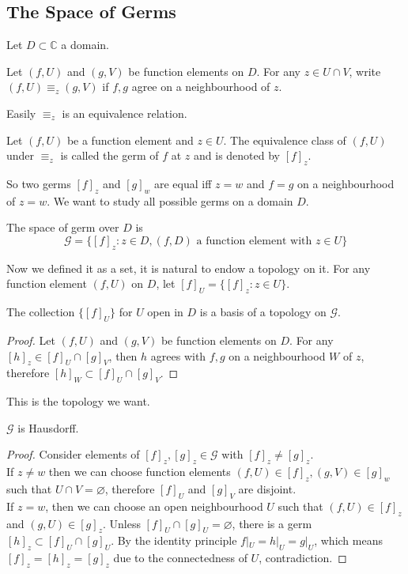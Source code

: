 \subsection{The Space of Germs}
Let $D\subset\mathbb C$ a domain.
\begin{definition}
    Let $(f,U)$ and $(g,V)$ be function elements on $D$.
    For any $z\in U\cap V$, write $(f,U)\equiv_z(g,V)$ if $f,g$ agree on a neighbourhood of $z$.
\end{definition}
Easily $\equiv_z$ is an equivalence relation.
\begin{definition}
    Let $(f,U)$ be a function element and $z\in U$.
    The equivalence class of $(f,U)$ under $\equiv_z$ is called the germ of $f$ at $z$ and is denoted by $[f]_z$.
\end{definition}
So two germs $[f]_z$ and $[g]_w$ are equal iff $z=w$ and $f=g$ on a neighbourhood of $z=w$.
We want to study all possible germs on a domain $D$.
\begin{definition}
    The space of germ over $D$ is
    $$\mathcal G=\{[f]_z:z\in D,(f,D)\text{ a function element with $z\in U$}\}$$
\end{definition}
Now we defined it as a set, it is natural to endow a topology on it.
For any function element $(f,U)$ on $D$, let $[f]_U=\{[f]_z:z\in U\}$.
\begin{lemma}
    The collection $\{[f]_U\}$ for $U$ open in $D$ is a basis of a topology on $\mathcal G$.
\end{lemma}
\begin{proof}
    Let $(f,U)$ and $(g,V)$ be function elements on $D$.
    For any $[h]_z\in [f]_U\cap [g]_V$, then $h$ agrees with $f,g$ on a neighbourhood $W$ of $z$, therefore $[h]_W\subset [f]_U\cap[g]_V$.
\end{proof}
This is the topology we want.
\begin{lemma}
    $\mathcal G$ is Hausdorff.
\end{lemma}
\begin{proof}
    Consider elements of $[f]_z,[g]_z\in\mathcal G$ with $[f]_z\neq [g]_z$.\\
    If $z\neq w$ then we can choose function elements $(f,U)\in [f]_z,(g,V)\in[g]_w$ such that $U\cap V=\varnothing$, therefore $[f]_U$ and $[g]_V$ are disjoint.\\
    If $z=w$, then we can choose an open neighbourhood $U$ such that $(f,U)\in[f]_z$ and $(g,U)\in [g]_z$.
    Unless $[f]_U\cap [g]_U=\varnothing$, there is a germ $[h]_z\subset [f]_U\cap[g]_U$.
    By the identity principle $f|_U=h|_U=g|_U$, which means $[f]_z=[h]_z=[g]_z$ due to the connectedness of $U$, contradiction.
\end{proof}
